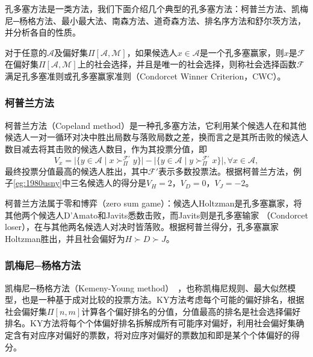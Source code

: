 孔多塞方法是一类方法，我们下面介绍几个典型的孔多塞方法：柯普兰方法、凯梅尼─杨格方法、最小最大法、南森方法、道奇森方法、排名序方法和舒尔茨方法，并分析各自的性质。

\begin{definition}[孔多塞准则]
对于任意的$\mathcal A$及偏好集$\Pi[\mathcal A, \mathcal M]$，如果候选人$x\in \mathcal A$是一个孔多塞赢家，则$x$是$\mathcal F$在偏好集$\Pi[\mathcal A,\mathcal M]$上的社会选择，并且是唯一的社会选择，则称社会选择函数$\mathcal F$满足孔多塞准则或孔多塞赢家准则（Condorcet Winner Criterion，CWC）。
\end{definition}

\subsubsection{柯普兰方法}
柯普兰方法（Copeland method）是一种孔多塞方法，它利用某个候选人在和其他候选人一对一循环对决中胜出局数与落败局数之差，换而言之是其所击败的候选人数目减去将其击败的候选人数目，作为其投票分值，即
\begin{equation}\label{eq:copeland}
    V_x = \big|\{y\in \mathcal A\mid x\succ_\Pi^\mathcal{F'} y\}\big| - \big|\{y\in \mathcal A\mid y\succ_\Pi^\mathcal{F'} x\}\big|, \forall x\in \mathcal A,
\end{equation}
最终投票分值最高的候选人胜出，其中$\mathcal{F'}$表示多数投票法。根据柯普兰方法，例子\ref{eg:1980usny}中三名候选人的得分是$V_H=2$，$V_D=0$，$V_J=-2$。

柯普兰方法属于零和博弈（zero sum game）：候选人Holtzman是孔多塞赢家，将其他两个候选人D'Amato和Javits悉数击败，而Javits则是孔多塞输家
（Condorcet loser），在与其他两名候选人对决时皆落败。根据柯普兰得分，孔多塞赢家Holtzman胜出，并且社会偏好为$H\succ D\succ J$。

\subsubsection{凯梅尼─杨格方法}
凯梅尼─杨格方法（Kemeny-Young method）~\cite{kemeny1959mathematics}，也称凯梅尼规则、最大似然模型，也是一种基于成对比较的投票方法。KY方法考虑每个可能的偏好排名，根据社会偏好集$\Pi[n,m]$计算各个偏好排名的分值，分值最高的排名是社会选择偏好排名。KY方法将每个个体偏好排名拆解成所有可能序对偏好，利用社会偏好集确定含有对应序对偏好的票数，将对应序对偏好的票数加和即是某个个体偏好的得分。


